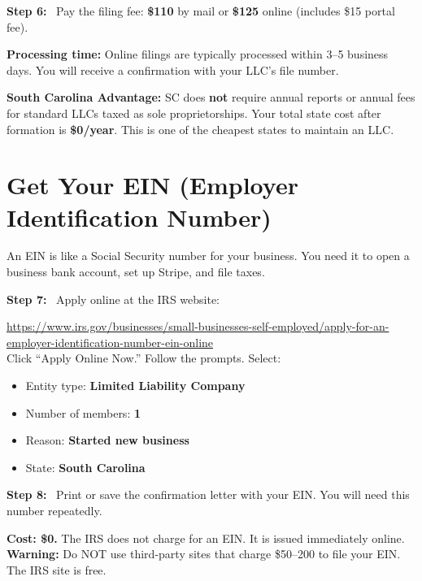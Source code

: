 \documentclass[12pt, letterpaper, oneside]{book}
\newcommand{\cost}[1]{\textcolor{money}{\textbf{#1}}}
\newcommand{\step}[1]{\noindent\textbf{\textcolor{primary}{Step #1:}}~}
\begin{document}
\step{6} Pay the filing fee: \cost{\$110} by mail or \cost{\$125} online (includes \$15 portal fee).

\begin{infobox}
\textbf{Processing time:} Online filings are typically processed within 3--5 business days. You will receive a confirmation with your LLC's file number.
\end{infobox}

\begin{costbox}
\textbf{South Carolina Advantage:} SC does \textbf{not} require annual reports or annual fees for standard LLCs taxed as sole proprietorships. Your total state cost after formation is \textbf{\$0/year}. This is one of the cheapest states to maintain an LLC.
\end{costbox}

\section{Get Your EIN (Employer Identification Number)}

An EIN is like a Social Security number for your business. You need it to open a business bank account, set up Stripe, and file taxes.

\step{7} Apply online at the IRS website:
\begin{actionbox}
\url{https://www.irs.gov/businesses/small-businesses-self-employed/apply-for-an-employer-identification-number-ein-online}\\[4pt]
Click ``Apply Online Now.'' Follow the prompts. Select:
\begin{itemize}[leftmargin=1.5em]
  \item Entity type: \textbf{Limited Liability Company}
  \item Number of members: \textbf{1}
  \item Reason: \textbf{Started new business}
  \item State: \textbf{South Carolina}
\end{itemize}
\end{actionbox}

\step{8} Print or save the confirmation letter with your EIN. You will need this number repeatedly.

\begin{successbox}
\textbf{Cost: \$0.} The IRS does not charge for an EIN. It is issued immediately online.\\[4pt]
\textbf{Warning:} Do NOT use third-party sites that charge \$50--200 to file your EIN. The IRS site is free.
\end{successbox}
\end{document}
